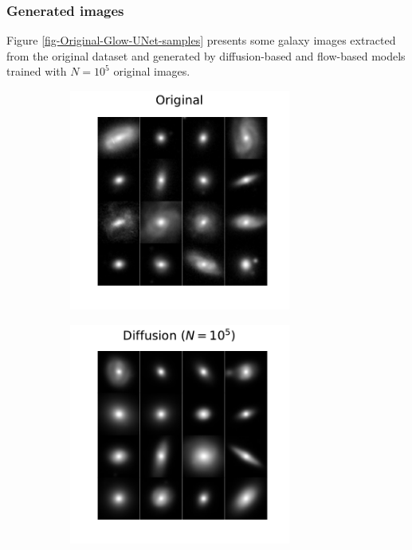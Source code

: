 \documentclass[11pt]{amsart}
\begin{document}
\subsubsection{Generated images}
Figure \ref{fig-Original-Glow-UNet-samples} presents some galaxy images extracted from the original dataset and generated by  diffusion-based and flow-based models trained with $N=10^5$ original images. 
%
\begin{figure}
    \centering
    \vspace{-0cm}
    \begin{subfigure}[t]{0.30\columnwidth}
    \begin{center}
        \centering
        \includegraphics[width=0.8\textwidth]{fig-original_samples_gray.pdf}
    \end{center}
    \end{subfigure}%
    \begin{subfigure}[t]{0.30\columnwidth}
    \begin{center}
        \centering
        \includegraphics[width=0.8\textwidth]{fig-diffusion_samples_gray.pdf}

\end{center}
\end{subfigure}
\end{figure}
\end{document}
